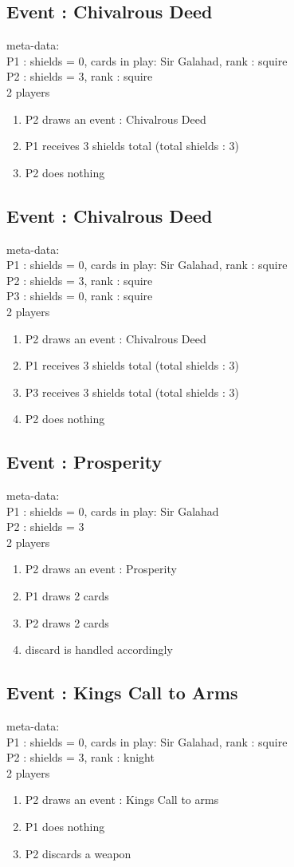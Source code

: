 \documentclass[a4paper,11pt]{article}
\begin{document}
\subsection{Event : Chivalrous Deed}
meta-data:\\
P1 : shields = 0, cards in play: Sir Galahad, rank : squire\\
P2 : shields = 3, rank : squire \\
2 players\\
\begin{enumerate}
	\item P2 draws an event : Chivalrous Deed
	\item P1 receives 3 shields total (total shields : 3)
	\item P2 does nothing
\end{enumerate}


\subsection{Event : Chivalrous Deed}
meta-data:\\
P1 : shields = 0, cards in play: Sir Galahad, rank : squire\\
P2 : shields = 3, rank : squire\\
P3 : shields = 0, rank : squire\\
2 players\\
\begin{enumerate}
	\item P2 draws an event : Chivalrous Deed
	\item P1 receives 3 shields total (total shields : 3)
	\item P3 receives 3 shields total (total shields : 3)
	\item P2 does nothing
\end{enumerate}


\subsection{Event : Prosperity}
meta-data:\\
P1 : shields = 0, cards in play: Sir Galahad\\
P2 : shields = 3\\
2 players\\
\begin{enumerate}
	\item P2 draws an event : Prosperity 
	\item P1 draws 2 cards
	\item P2 draws 2 cards
	\item discard is handled accordingly 
\end{enumerate}

\subsection{Event : Kings Call to Arms}
meta-data:\\
P1 : shields = 0, cards in play: Sir Galahad, rank : squire\\
P2 : shields = 3, rank : knight\\
2 players\\
\begin{enumerate}
	\item P2 draws an event : Kings Call to arms 
	\item P1 does nothing
	\item P2 discards a weapon 
\end{enumerate}
\end{document}
